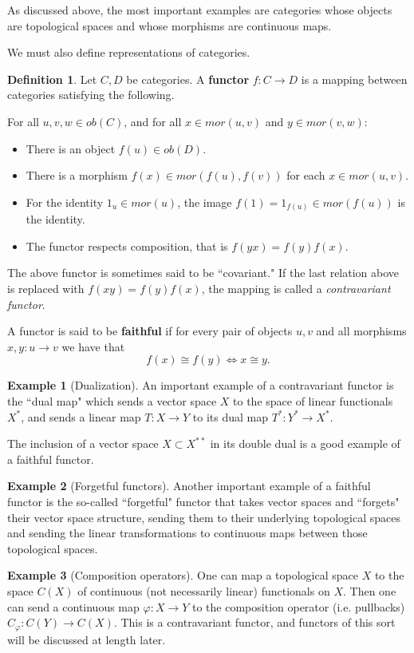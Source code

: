 \documentclass[12pt]{amsart}
\theoremstyle{definition}
\newtheorem{definition}[theorem]{Definition}
\newtheorem{example}{Example}[theorem]
\numberwithin{equation}{section}
\begin{document}
As discussed above, the most important examples are categories whose objects are topological spaces and whose morphisms are continuous maps. 

We must also define representations of categories. 

\begin{definition}
    Let $C, D$ be categories. A \textbf{functor} $f: C\rightarrow D$ is a mapping between categories satisfying the following. 
    
    For all $u, v, w \in ob(C)$, and for all $x\in mor(u, v)$ and $y\in mor(v, w)$:  
    \begin{itemize}
        \item There is an object $f(u) \in ob(D)$.
        \item There is a morphism $f(x) \in mor(f(u), f(v))$ for each $x \in mor(u, v)$.
        \item For the identity $1_{u} \in mor(u)$, the image $f(1) = 1_{f(u)} \in mor(f(u))$ is the identity. 
        \item The functor respects composition, that is $f(yx) = f(y)f(x)$.
    \end{itemize}

    The above functor is sometimes said to be ``covariant." If the last relation above is replaced with $f(xy) = f(y)f(x)$, the mapping is called a  \textit{contravariant functor}. 

    A functor is said to be \textbf{faithful} if for every pair of objects $u, v$ and all morphisms $x,y: u\rightarrow v$ we have that \[f(x) \cong f(y) \iff x \cong y.\] 
\end{definition}

\begin{example}[Dualization]
    An important example of a contravariant functor is the ``dual map" which sends a vector space $X$ to the space of linear functionals $X^*$, and sends a linear map $T: X \rightarrow Y$ to its dual map $T^*: Y^*\rightarrow X^*.$
    
    The inclusion of a vector space $X \subset X^{**}$ in its double dual is a good example of a faithful functor. 
\end{example}
\begin{example}[Forgetful functors]
Another important example of a faithful functor is the so-called ``forgetful" functor that takes vector spaces and ``forgets" their vector space structure, sending them to their underlying topological spaces and sending the linear transformations to continuous maps between those topological spaces. 
\end{example}
\begin{example}[Composition operators]
One can map a topological space $X$ to the space $C(X)$ of continuous (not necessarily linear) functionals on $X.$ Then one can send a continuous map $\varphi: X\rightarrow Y$ to the composition operator (i.e. pullbacks) $C_{\varphi}: C(Y) \rightarrow C(X).$ This is a contravariant functor, and functors of this sort will be discussed at length later. 
\end{example}
\end{document}
